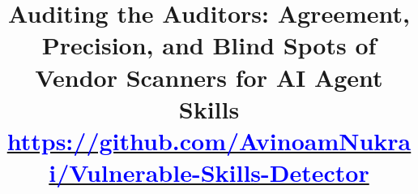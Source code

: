 \documentclass[conference]{IEEEtran}
\begin{document}
\title{Auditing the Auditors: Agreement, Precision, and Blind Spots of Vendor Scanners for AI Agent Skills\\[0.45em]
\normalfont\normalsize\href{https://github.com/AvinoamNukrai/Vulnerable-Skills-Detector}{\textcolor{blue}{https://github.com/AvinoamNukrai/Vulnerable-Skills-Detector}}}

\author{%
%
}

\maketitle

\begin{abstract}
\normalfont\mdseries\normalsize

\end{abstract}
\end{document}

